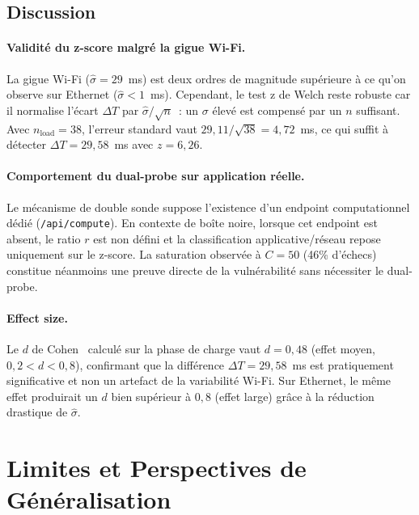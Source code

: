 \documentclass[10pt,conference,compsoc]{IEEEtran}
\begin{document}
\subsection{Discussion}

\paragraph{Validité du z-score malgré la gigue Wi-Fi.}
La gigue Wi-Fi ($\hat{\sigma} = 29$~ms) est deux ordres de magnitude
supérieure à ce qu'on observe sur Ethernet ($\hat{\sigma} < 1$~ms).
Cependant, le test z de Welch reste robuste car il normalise l'écart
$\Delta T$ par $\hat{\sigma}/\sqrt{n}$~: un $\sigma$ élevé est compensé
par un $n$ suffisant. Avec $n_{\mathrm{load}} = 38$, l'erreur standard
vaut $29{,}11/\sqrt{38} = 4{,}72$~ms, ce qui suffit à détecter
$\Delta T = 29{,}58$~ms avec $z = 6{,}26$.

\paragraph{Comportement du dual-probe sur application réelle.}
Le mécanisme de double sonde suppose l'existence d'un endpoint
computationnel dédié (\texttt{/api/compute}). En contexte de boîte
noire, lorsque cet endpoint est absent, le ratio $r$ est non défini et
la classification applicative/réseau repose uniquement sur le z-score.
La saturation observée à $C = 50$ (46\% d'échecs) constitue néanmoins
une preuve directe de la vulnérabilité sans nécessiter le dual-probe.

\paragraph{Effect size.}
Le $d$ de Cohen~\cite{cohen1988statistical} calculé sur la phase de
charge vaut $d = 0{,}48$ (effet moyen, $0{,}2 < d < 0{,}8$), confirmant
que la différence $\Delta T = 29{,}58$~ms est pratiquement significative
et non un artefact de la variabilité Wi-Fi. Sur Ethernet, le même effet
produirait un $d$ bien supérieur à $0{,}8$ (effet large) grâce à la
réduction drastique de $\hat{\sigma}$.

\section{Limites et Perspectives de Généralisation}
\label{sec:limites}
\end{document}
